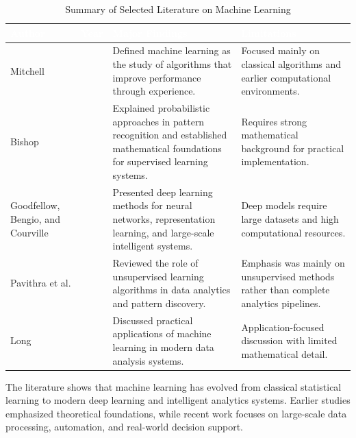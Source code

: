 \documentclass[11pt,a4paper]{article}
\begin{document}
\begin{table}[H]
\centering
\caption{Summary of Selected Literature on Machine Learning}
\renewcommand{\arraystretch}{1.35}
\small
\begin{tabular}{>{\raggedright\arraybackslash}p{3.0cm} >{\raggedright\arraybackslash}p{1.6cm} >{\raggedright\arraybackslash}p{5.0cm} >{\raggedright\arraybackslash}p{4.2cm}}
\toprule
\rowcolor{prismblue}
\textcolor{white}{\textbf{Author}} & \textcolor{white}{\textbf{Year}} & \textcolor{white}{\textbf{Major Findings}} & \textcolor{white}{\textbf{Limitations}} \\
\midrule
\rowcolor{prismlight}
Mitchell \cite{mitchell1997machine} & 1997 & Defined machine learning as the study of algorithms that improve performance through experience. & Focused mainly on classical algorithms and earlier computational environments. \\
Bishop \cite{bishop2006pattern} & 2006 & Explained probabilistic approaches in pattern recognition and established mathematical foundations for supervised learning systems. & Requires strong mathematical background for practical implementation. \\
\rowcolor{prismlight}
Goodfellow, Bengio, and Courville \cite{goodfellow2016deep} & 2016 & Presented deep learning methods for neural networks, representation learning, and large-scale intelligent systems. & Deep models require large datasets and high computational resources. \\
Pavithra et al. \cite{pavithra2021role} & 2021 & Reviewed the role of unsupervised learning algorithms in data analytics and pattern discovery. & Emphasis was mainly on unsupervised methods rather than complete analytics pipelines. \\
\rowcolor{prismlight}
Long \cite{long2025practice} & 2025 & Discussed practical applications of machine learning in modern data analysis systems. & Application-focused discussion with limited mathematical detail. \\
\bottomrule
\end{tabular}
\end{table}

The literature shows that machine learning has evolved from classical statistical learning to modern deep learning and intelligent analytics systems. Earlier studies emphasized theoretical foundations, while recent work focuses on large-scale data processing, automation, and real-world decision support.

\end{document}
